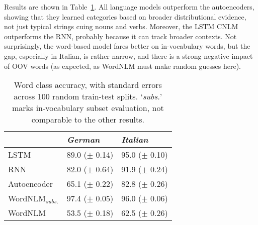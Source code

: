 Results are shown in Table~\ref{tab:pos-results}.  All language models
outperform the autoencoders, showing that they learned categories
based on broader distributional evidence, not just typical strings
cuing nouns and verbs. Moreover, the LSTM CNLM outperforms the RNN,
probably because it can track broader contexts. Not surprisingly, the
word-based model fares better on in-vocabulary words, but the gap,
especially in Italian, is rather narrow, and there is a strong
negative impact of OOV
words (as expected, as WordNLM must make random guesses here). %

\begin{table}[t]
\footnotesize
    \begin{center}
      \begin{tabular}{l|l|l}
        &\emph{German}&\emph{Italian}\\
        \hline
        LSTM & 89.0 ($\pm$ 0.14) & 95.0 ($\pm$ 0.10) \\
        RNN & 82.0 ($\pm$ 0.64) & 91.9 ($\pm$ 0.24) \\
        Autoencoder & 65.1 ($\pm$ 0.22) & 82.8 ($\pm$ 0.26) \\
	      WordNLM$_{\textit{subs.}}$ & 97.4 ($\pm$ 0.05) & 96.0 ($\pm$ 0.06) \\
	      WordNLM & 53.5 ($\pm$ 0.18)  & 62.5 ($\pm$ 0.26) \\
      \end{tabular}
    \end{center}
	\caption{\label{tab:pos-results} Word class accuracy, with standard errors across 100 random train-test splits. `\emph{subs.}' marks in-vocabulary subset evaluation, not comparable to the other results.} %
\end{table}






